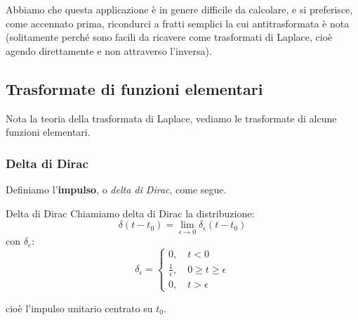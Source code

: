 \documentclass[a4paper,11pt]{article}
\begin{document}
\par\smallskip

Abbiamo che questa applicazione è in genere difficile da calcolare, e si preferisce, come accennato prima, ricondurci a fratti semplici la cui antitrasformata è nota (solitamente perché sono facili da ricavere come trasformati di Laplace, cioè agendo direttamente e non attraverso l'inversa).

\subsection{Trasformate di funzioni elementari}
Nota la teoria della trasformata di Laplace, vediamo le trasformate di alcune funzioni elementari.

\subsubsection{Delta di Dirac}
Definiamo l'\textbf{impulso}, o \textit{delta di Dirac}, come segue.
\begin{definition}{Delta di Dirac}
	Chiamiamo delta di Dirac la distribuzione:
	$$
	\delta(t - t_0) = \lim_{\epsilon \rightarrow 0} \delta_\epsilon (t - t_0)
	$$
	con $\delta_e$:
	$$
	\delta_\epsilon =
	\begin{cases}
		0, \quad t < 0 \\
		\frac{1}{\epsilon}, \quad 0 \geq t \geq \epsilon \\
		0, \quad t > \epsilon
	\end{cases}
	$$
\end{definition}
cioè l'impulso unitario centrato su $t_0$.
\end{document}
